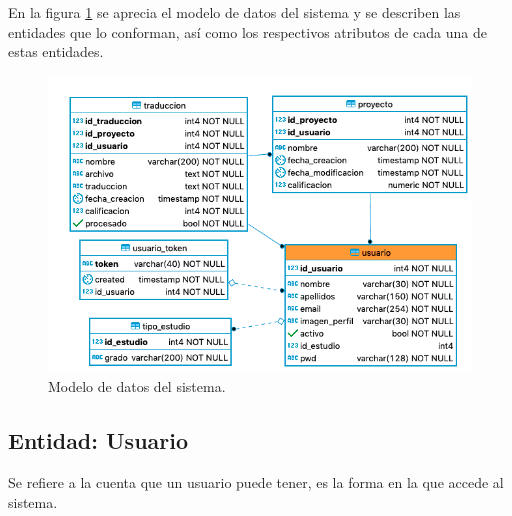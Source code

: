 En la figura \ref{fig:db} se aprecia el modelo de datos del sistema y se describen las entidades que lo conforman, así como los respectivos atributos de cada una de estas entidades.
\begin{figure}[h]
	\centering
	\includegraphics[width=\textwidth]{capitulo4/imagenes/tt_base.png}
	\caption{Modelo de datos del sistema.}
	\label{fig:db}
\end{figure}

\subsection{Entidad: Usuario}
Se refiere a la cuenta que un usuario puede tener, es la forma en la que accede al sistema.
